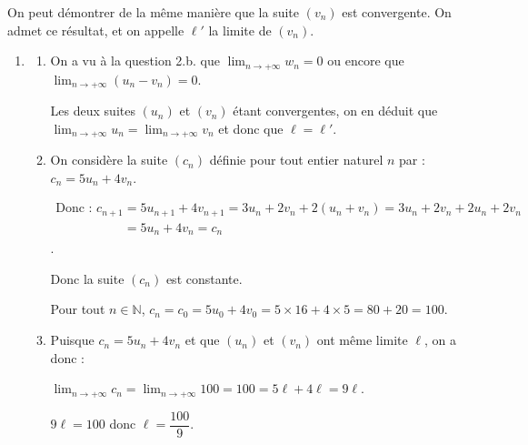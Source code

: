 \documentclass[10pt]{article}
\providecommand{\N}{\mathbb{N}}
\begin{document}
On peut démontrer de la même manière que la suite $\left(v_n\right)$ est convergente. On admet ce résultat, et on appelle $\ell'$ la limite de $\left(v_n\right)$.
\begin{enumerate}[resume]
\item 
	\begin{enumerate}
		\item 
		On a vu à la question 2.b. que $\displaystyle\lim_{n \to + \infty} w_n = 0$ ou encore que $\displaystyle\lim_{n \to + \infty}\left ( u_n - v_n\right ) = 0$.
		
Les deux suites $(u_n)$ et $(v_n)$ étant convergentes, on en déduit que
$\displaystyle\lim_{n \to + \infty} u_n  = \lim_{n \to + \infty} v_n $		
		 et donc que  $\ell = \ell'$.
		\item On considère la suite $\left(c_n\right)$ définie pour tout entier naturel $n$ par : $c_n = 5u_n + 4v_n$.
		



$\begin{gathered}\text{Donc : }c_{n+1} = 5u_{n+1} + 4v_{n+1} = 3u_n + 2v_n + 2\left(u_n  + v_n \right) = 3u_n + 2v_n + 2u_n  + 2v_n \\
\phantom{\text{Donc : }c_{n+1}}= 5u_n + 4v_n = c_n\end{gathered}$. 

Donc la suite  $\left(c_n\right)$ est constante.


Pour tout $n\in\N$,  $c_n = c_0 = 5u_0 + 4v_0 = 5 \times 16 + 4 \times 5 = 80 + 20 = 100$.
		\item 
Puisque $c_n = 5u_n + 4v_n$ et que $\left(u_n\right)$ et $\left(v_n\right)$ ont même limite $\ell$, on a donc :

$\displaystyle\lim_{n \to + \infty}c_n = \displaystyle\lim_{n \to + \infty}100 = 100 = 5\ell + 4\ell = 9\ell$.

$9\ell = 100$ donc $\ell = \dfrac{100}{9}$.
	\end{enumerate}
\end{enumerate}

\bigskip
\end{document}

